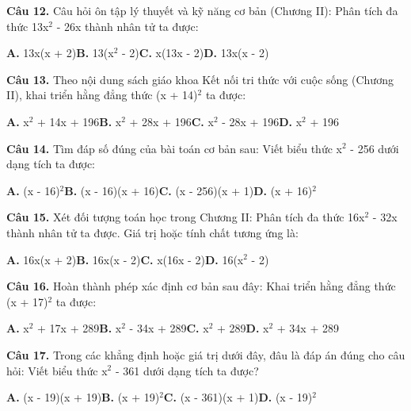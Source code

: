 \documentclass[11pt,a4paper]{article}
\begin{document}
\textbf{\color{primary} Câu 12.} Câu hỏi ôn tập lý thuyết và kỹ năng cơ bản (Chương II): Phân tích đa thức 13x$^2$ - 26x thành nhân tử ta được:\par
\hspace*{1.5em}\textbf{A.} 13x(x + 2)\quad\quad \textbf{B.} 13(x$^2$ - 2)\quad\quad \textbf{C.} x(13x - 2)\quad\quad \textbf{D.} 13x(x - 2)\par\vspace{2pt}
\textbf{\color{primary} Câu 13.} Theo nội dung sách giáo khoa Kết nối tri thức với cuộc sống (Chương II), khai triển hằng đẳng thức (x + 14)$^2$ ta được:\par
\hspace*{1.5em}\textbf{A.} x$^2$ + 14x + 196\quad\quad \textbf{B.} x$^2$ + 28x + 196\quad\quad \textbf{C.} x$^2$ - 28x + 196\quad\quad \textbf{D.} x$^2$ + 196\par\vspace{2pt}
\textbf{\color{primary} Câu 14.} Tìm đáp số đúng của bài toán cơ bản sau: Viết biểu thức x$^2$ - 256 dưới dạng tích ta được:\par
\hspace*{1.5em}\textbf{A.} (x - 16)$^2$\quad\quad \textbf{B.} (x - 16)(x + 16)\quad\quad \textbf{C.} (x - 256)(x + 1)\quad\quad \textbf{D.} (x + 16)$^2$\par\vspace{2pt}
\textbf{\color{primary} Câu 15.} Xét đối tượng toán học trong Chương II: Phân tích đa thức 16x$^2$ - 32x thành nhân tử ta được. Giá trị hoặc tính chất tương ứng là:\par
\hspace*{1.5em}\textbf{A.} 16x(x + 2)\quad\quad \textbf{B.} 16x(x - 2)\quad\quad \textbf{C.} x(16x - 2)\quad\quad \textbf{D.} 16(x$^2$ - 2)\par\vspace{2pt}
\textbf{\color{primary} Câu 16.} Hoàn thành phép xác định cơ bản sau đây: Khai triển hằng đẳng thức (x + 17)$^2$ ta được:\par
\hspace*{1.5em}\textbf{A.} x$^2$ + 17x + 289\quad\quad \textbf{B.} x$^2$ - 34x + 289\quad\quad \textbf{C.} x$^2$ + 289\quad\quad \textbf{D.} x$^2$ + 34x + 289\par\vspace{2pt}
\textbf{\color{primary} Câu 17.} Trong các khẳng định hoặc giá trị dưới đây, đâu là đáp án đúng cho câu hỏi: Viết biểu thức x$^2$ - 361 dưới dạng tích ta được?\par
\hspace*{1.5em}\textbf{A.} (x - 19)(x + 19)\quad\quad \textbf{B.} (x + 19)$^2$\quad\quad \textbf{C.} (x - 361)(x + 1)\quad\quad \textbf{D.} (x - 19)$^2$\par\vspace{2pt}
\end{document}

